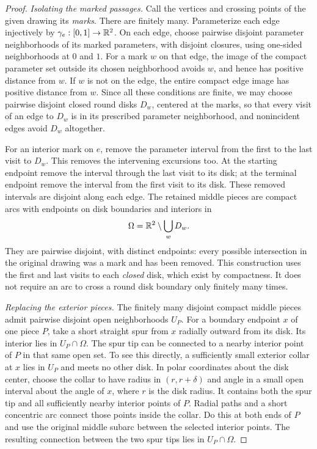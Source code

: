 \begin{proof}
\emph{Isolating the marked passages.}
Call the vertices and crossing points of the given drawing its
\emph{marks}.  There are finitely many.  Parameterize each edge
injectively by $\gamma_e:[0,1]\to\mathbb R^2$.  On each edge, choose pairwise
disjoint parameter neighborhoods of its marked parameters, with
disjoint closures, using one-sided neighborhoods at $0$ and $1$.
For a mark $w$ on that edge, the image of the compact parameter set
outside its chosen neighborhood avoids $w$, and hence has positive
distance from $w$.  If $w$ is not on the edge, the entire compact edge
image has positive distance from $w$.  Since all these conditions are
finite, we may choose pairwise disjoint closed round disks $D_w$,
centered at the marks, so that every visit of an edge to $D_w$ is in
its prescribed parameter neighborhood, and nonincident edges avoid
$D_w$ altogether.

For an interior mark on $e$, remove the parameter interval from the
first to the last visit to $D_w$.  This removes the intervening
excursions too.  At the starting endpoint remove the interval through
the last visit to its disk; at the terminal endpoint remove the
interval from the first visit to its disk.  These removed intervals
are disjoint along each edge.  The retained middle pieces are compact
arcs with endpoints on disk boundaries and interiors in
\[
 \Omega=\mathbb R^2\setminus\bigcup_w D_w.
\]
They are pairwise disjoint, with distinct endpoints: every possible
intersection in the original drawing was a mark and has been removed.
This construction uses the first and last visits to each \emph{closed}
disk, which exist by compactness.  It does not require an arc to cross
a round disk boundary only finitely many times.

\emph{Replacing the exterior pieces.}
The finitely many disjoint compact middle pieces admit pairwise
disjoint open neighborhoods $U_P$.  For a boundary endpoint $x$ of
one piece $P$, take a short straight spur from $x$ radially outward
from its disk.  Its interior lies in $U_P\cap\Omega$.
The spur tip can be connected to a nearby interior point of $P$ in
that same open set.  To see this directly, a sufficiently small
exterior collar at $x$ lies in $U_P$ and meets no other disk.  In polar
coordinates about the disk center, choose the collar to have radius
in $(r,r+\delta)$ and angle in a small open interval about the angle
of $x$, where $r$ is the disk radius.  It contains both the spur tip
and all sufficiently nearby interior points of $P$.  Radial paths
and a short concentric arc connect those points inside the collar.
Do this at both ends of $P$ and use the original middle subarc between
the selected interior points.  The resulting connection between the
two spur tips lies in $U_P\cap\Omega$.


\end{proof}
